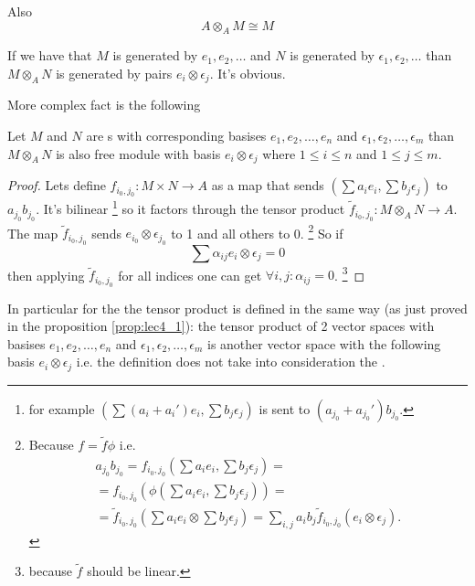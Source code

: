 Also
\[
A \otimes_A M \cong M
\]

If we have that $M$ is generated by $e_1, e_2, \dots$ and
$N$ is generated by $\epsilon_1, \epsilon_2, \dots$ than
$M \otimes_A N$ is generated by pairs $e_i \otimes \epsilon_j$. It's
obvious.

More complex fact is the following
\begin{proposition}
  Let $M$ and $N$ are s
  with corresponding basises $e_1, e_2, \dots, e_n$ and
  $\epsilon_1, \epsilon_2, \dots, \epsilon_m$ than
  $M \otimes_A N$ is also free module with basis $e_i \otimes
  \epsilon_j$ where $1 \le i \le n$ and
  $1 \le j \le m$.
  \begin{proof}
    Lets define
    $f_{i_0,j_0}: M \times N \to A$ as a map that sends
    $\left(\sum a_i e_i, \sum b_j \epsilon_j\right)$ to
    $a_{j_0} b_{j_0}$. It's bilinear
    \footnote{
      for example
      $\left(\sum (a_i + a_i') e_i, \sum b_j \epsilon_j\right)$ is
      sent to  $(a_{j_0} + a_{j_0}') b_{j_0}$.
    }
    so it factors through the tensor product
    $\tilde{f}_{i_0, j_0} : M \otimes_A N \to A$. The map
    $\tilde{f}_{i_0, j_0}$ sends $e_{i_0} \otimes \epsilon_{j_0}$ to 1
    and all others to 0.
    \footnote{
      Because $f = \tilde{f} \phi$ i.e.
      \begin{eqnarray}
      a_{j_0} b_{j_0} =
      f_{i_0,j_0}\left(\sum a_i e_i, \sum b_j\epsilon_j\right) =
      \nonumber \\
      =  f_{i_0,j_0}\left(
      \phi\left(\sum a_i e_i, \sum b_j\epsilon_j\right)\right) = 
      \nonumber \\
      =
      \tilde{f}_{i_0,j_0}\left(\sum a_i e_i \otimes \sum b_j
      \epsilon_j\right) =
      \sum_{i,j} a_i b_j \tilde{f}_{i_0,j_0}(e_i \otimes \epsilon_j).
      \nonumber
      \end{eqnarray}
    }
    So if
    \[
    \sum \alpha_{ij} e_i \otimes \epsilon_j = 0
    \]
    then applying $\tilde{f}_{i_0, j_0}$ for all indices one can get
    $\forall i,j: \alpha_{ij} = 0$.
    \footnote{
      because $\tilde{f}$ should be linear.
    }
  \end{proof}
  \label{prop:lec4_1}
\end{proposition}

In particular for the  the tensor product is
defined in the same way (as just proved in the proposition
\ref{prop:lec4_1}): the tensor product of 2 vector spaces with
basises $e_1, e_2, \dots, e_n$ and
$\epsilon_1, \epsilon_2, \dots, \epsilon_m$ is another vector space
with the following basis $e_i \otimes \epsilon_j$ i.e. the definition
does not take into consideration the .

